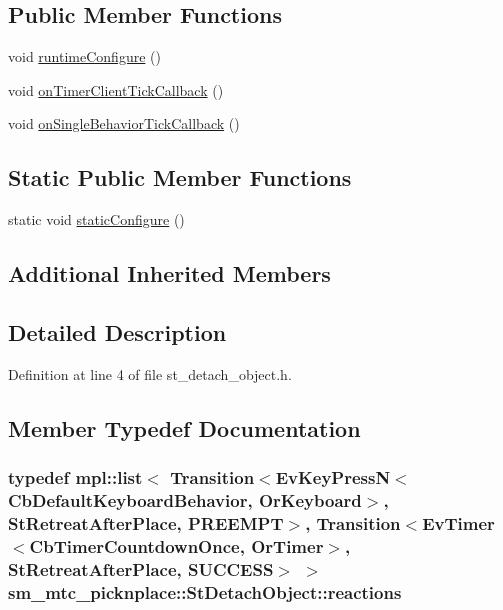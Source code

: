 \subsection*{Public Member Functions}
\begin{DoxyCompactItemize}
\item 
void \hyperlink{structsm__mtc__picknplace_1_1StDetachObject_a734f34adeabde0f8541bd4239546ed1a}{runtime\+Configure} ()
\item 
void \hyperlink{structsm__mtc__picknplace_1_1StDetachObject_a7e9907ca8a558a6a829f72feffcc6060}{on\+Timer\+Client\+Tick\+Callback} ()
\item 
void \hyperlink{structsm__mtc__picknplace_1_1StDetachObject_a88499652920b184cea2555c026e43e88}{on\+Single\+Behavior\+Tick\+Callback} ()
\end{DoxyCompactItemize}
\subsection*{Static Public Member Functions}
\begin{DoxyCompactItemize}
\item 
static void \hyperlink{structsm__mtc__picknplace_1_1StDetachObject_ace50c7d119025cf3b78a95e9fba91e4e}{static\+Configure} ()
\end{DoxyCompactItemize}
\subsection*{Additional Inherited Members}


\subsection{Detailed Description}


Definition at line 4 of file st\+\_\+detach\+\_\+object.\+h.



\subsection{Member Typedef Documentation}
\subsubsection[{\texorpdfstring{reactions}{reactions}}]{\setlength{\rightskip}{0pt plus 5cm}typedef mpl\+::list$<$ Transition$<$Ev\+Key\+PressN$<$Cb\+Default\+Keyboard\+Behavior, {\bf Or\+Keyboard}$>$, {\bf St\+Retreat\+After\+Place}, {\bf P\+R\+E\+E\+M\+PT}$>$, Transition$<$Ev\+Timer$<$Cb\+Timer\+Countdown\+Once, {\bf Or\+Timer}$>$, {\bf St\+Retreat\+After\+Place}, {\bf S\+U\+C\+C\+E\+SS}$>$ $>$ {\bf sm\+\_\+mtc\+\_\+picknplace\+::\+St\+Detach\+Object\+::reactions}}\hypertarget{structsm__mtc__picknplace_1_1StDetachObject_a2d9f1674c4132c677c50092a19c67b1e}{}\label{structsm__mtc__picknplace_1_1StDetachObject_a2d9f1674c4132c677c50092a19c67b1e}


